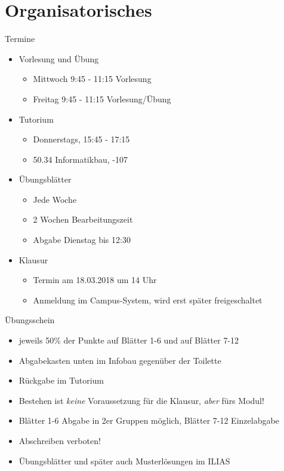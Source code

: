 \documentclass{beamer}
\begin{document}

\begin{frame}
	\titlepage
\end{frame}

\section{Organisatorisches}

\begin{frame}{Termine}
	\begin{itemize}
		 
		\item Vorlesung und Übung
			\begin{itemize}
				\item Mittwoch 9:45 - 11:15 Vorlesung
				\item Freitag 9:45 - 11:15 Vorlesung/Übung
			\end{itemize}
		
		 
		\item Tutorium
			\begin{itemize}
				\item Donnerstags, 15:45 - 17:15
				\item 50.34 Informatikbau, -107
			\end{itemize}
		
		 
		\item Übungsblätter
		\begin{itemize}
			\item Jede Woche
			\item 2 Wochen Bearbeitungszeit
			\item Abgabe Dienstag bis 12:30
		\end{itemize}
		 
		\item Klausur
		\begin{itemize}
			\item Termin am 18.03.2018 um 14 Uhr
			\item Anmeldung im Campus-System, wird erst später freigeschaltet
		\end{itemize}
	\end{itemize}
\end{frame}

\begin{frame}{Übungsschein}
	\begin{itemize}
		 
		\item jeweils 50\% der Punkte auf Blätter 1-6 und auf Blätter 7-12
		\item Abgabekasten unten im Infobau gegenüber der Toilette
		\item Rückgabe im Tutorium 
		\item Bestehen ist \emph{keine} Voraussetzung für die Klausur, \emph{aber} fürs Modul! 
		\item Blätter 1-6 Abgabe in 2er Gruppen möglich, Blätter 7-12 Einzelabgabe
		\item Abschreiben verboten!
		\item Übungsblätter und später auch Musterlösungen im ILIAS
	\end{itemize}
\end{frame}
\end{document}
